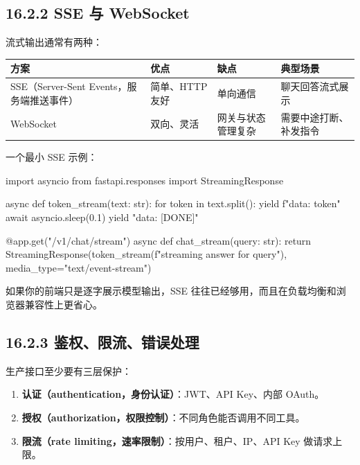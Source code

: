 \subsection{16.2.2 SSE 与 WebSocket}

流式输出通常有两种：


\begingroup
\scriptsize
\setlength{\tabcolsep}{3pt}
\begin{longtable}{|p{}|p{}|p{}|p{}|}
\hline
方案 & 优点 & 缺点 & 典型场景 \\ \hline
SSE（Server-Sent Events，服务端推送事件） & 简单、HTTP 友好 & 单向通信 & 聊天回答流式展示 \\ \hline
WebSocket & 双向、灵活 & 网关与状态管理复杂 & 需要中途打断、补发指令 \\ \hline
\end{longtable}
\endgroup

一个最小 SSE 示例：


\begin{codeblock}
import asyncio
from fastapi.responses import StreamingResponse

async def token_stream(text: str):
    for token in text.split():
        yield f"data: {token}\n\n"
        await asyncio.sleep(0.1)
    yield "data: [DONE]\n\n"

@app.get("/v1/chat/stream")
async def chat_stream(query: str):
    return StreamingResponse(token_stream(f"streaming answer for {query}"), media_type="text/event-stream")
\end{codeblock}

如果你的前端只是逐字展示模型输出，SSE 往往已经够用，而且在负载均衡和浏览器兼容性上更省心。


\subsection{16.2.3 鉴权、限流、错误处理}

生产接口至少要有三层保护：


\begin{enumerate}[leftmargin=2em]
\item \textbf{认证（authentication，身份认证）}：JWT、API Key、内部 OAuth。
\item \textbf{授权（authorization，权限控制）}：不同角色能否调用不同工具。
\item \textbf{限流（rate limiting，速率限制）}：按用户、租户、IP、API Key 做请求上限。
\end{enumerate}

